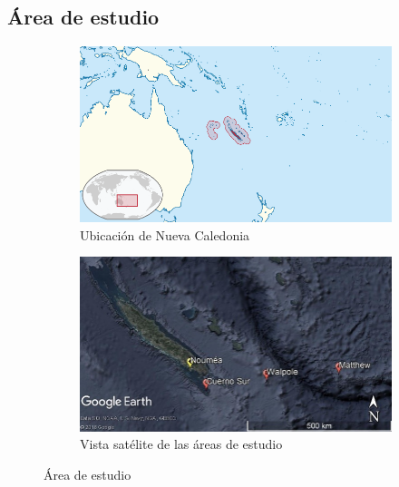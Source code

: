 \documentclass[a4paper, 11pt]{article}
\begin{document}
\subsection{Área de estudio}
\begin{figure}[b]
	
	\begin{subfigure}[b]{0.5\textwidth}
		\includegraphics[width=\textwidth]				 				{Mapa_Nueva_Caledonia}
		\caption{Ubicación de Nueva Caledonia}
		\label{fig:1.a}	
	\end{subfigure}
	\begin{subfigure}[b]{0.5\textwidth}
		\includegraphics[width=\textwidth]								{Mapa_area_de_muestreo}
		\caption{Vista satélite de las áreas de estudio}
		\label{fig:1.b}	
	\end{subfigure}
	\caption{Área de estudio}
\end{figure}
\end{document}
